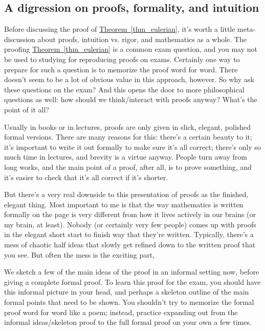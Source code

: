 \documentclass[10pt,]{book}
\theoremstyle{plain}
\theoremstyle{definition}
\theoremstyle{definition}
\theoremstyle{definition}
\theoremstyle{definition}
\numberwithin{equation}{section}
\begin{document}
\subsection[{A digression on proofs, formality, and intuition}]{A digression on proofs, formality, and intuition}\label{subsection-18}
\hypertarget{p-125}{}%
Before discussing the proof of \hyperref[thm_eulerian]{Theorem~\ref{thm_eulerian}}, it's worth a little meta-discussion about proofs, intuition vs. rigor, and mathematics as a whole.  The proofing \hyperref[thm_eulerian]{Theorem~\ref{thm_eulerian}} is a common exam question, and you may not be used to studying for reproducing proofs on exams.  Certainly one way to prepare for such a question is to memorize the proof word for word.  There doesn't seem to be a lot of obvious value in this approach, however.  So why ask these questions on the exam? And this opens the door to more philosophical questions as well: how should we think/interact with proofs anyway?  What's the point of it all?%
\par
\hypertarget{p-126}{}%
Usually in books or in lectures, proofs are only given in slick, elegant, polished formal versions.  There are many reasons for this: there's a certain beauty to it; it's important to write it out formally to make sure it's all correct; there's only so much time in lectures, and brevity is a virtue anyway.  People turn away from long works, and the main point of a proof, after all, is to prove something, and it's easier to check that it's all correct if it's shorter.%
\par
\hypertarget{p-127}{}%
But there's a very real downside to this presentation of proofs as the finished, elegant thing.  Most important to me is that the way mathematics is written formally on the page is very different from how it lives actively in our brains (or my brain, at least).  Nobody (or certainly very few people) comes up with proofs in the elegant short start to finish way that they're written.  Typically, there's a mess of chaotic half ideas that slowly get refined down to the written proof that you see.  But often the mess is the exciting part,%
\par
\hypertarget{p-128}{}%
We sketch a few of the main ideas of the proof in an informal setting now, before giving a complete formal proof.  To learn this proof for the exam, you should have this informal picture in your head, and perhaps a skeleton outline of the main formal points that need to be shown.  You shouldn't try to memorize the formal proof word for word like a poem; instead, practice expanding out from the informal ideas/skeleton proof to the full formal proof on your own a few times.%
\end{document}
